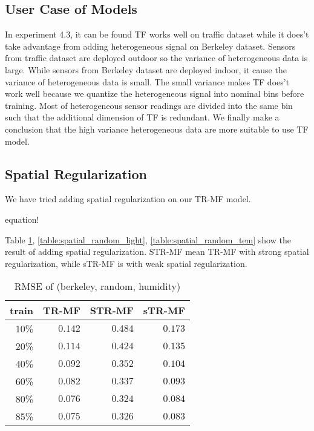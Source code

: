 \subsection{User Case of Models}


In experiment 4.3, it can be found TF works well on traffic dataset while it does't take advantage from adding heterogeneous signal on Berkeley dataset.
Sensors from traffic dataset are deployed outdoor so the variance of heterogeneous data is large.
While sensors from Berkeley dataset are deployed indoor, it cause the variance of heterogeneous data is small.
The small variance makes TF does't work well because we quantize the heterogeneous signal into nominal bins before training.
Most of heterogeneous sensor readings are divided into the same bin such that the additional dimension of TF is redundant.
We finally make a conclusion that the high variance heterogeneous data are more suitable to use TF model.

\subsection{Spatial Regularization}
We have tried adding spatial regularization on our TR-MF model.

equation!

Table \ref{table:spatial_random_hum}, \ref{table:spatial_random_light}, \ref{table:spatial_random_tem} show the result of adding spatial regularization. STR-MF mean TR-MF with strong spatial regularization, while sTR-MF is with weak spatial regularization.

\begin{table} [htbp]
\setlength{\tabcolsep}{2pt}
\centering
\caption{RMSE of (berkeley, random, humidity)}
\label{table:spatial_random_hum}
\begin{tabular} {r | r r r}
	train	& TR-MF	&	STR-MF	&	sTR-MF	\\ \hline
	10\% & $ \mathbf{ 0.142 } $ & $ 0.484 $ & $ 0.173 $ \\
	20\% & $ \mathbf{ 0.114 } $ & $ 0.424 $ & $ 0.135 $ \\
	40\% & $ \mathbf{ 0.092 } $ & $ 0.352 $ & $ 0.104 $ \\
	60\% & $ \mathbf{ 0.082 } $ & $ 0.337 $ & $ 0.093 $ \\
	80\% & $ \mathbf{ 0.076 } $ & $ 0.324 $ & $ 0.084 $ \\
	85\% & $ \mathbf{ 0.075 } $ & $ 0.326 $ & $ 0.083 $ \\
\end{tabular}
\end{table}


